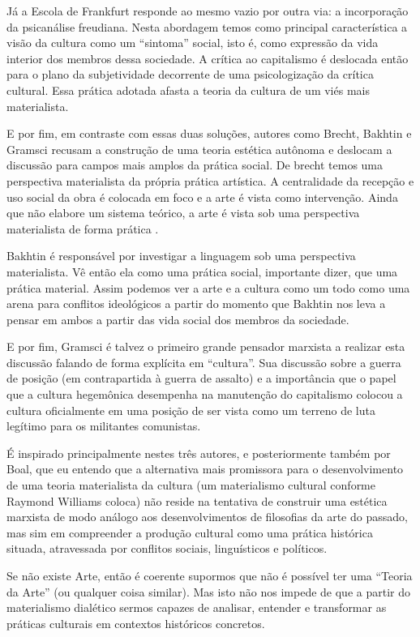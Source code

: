 Já a Escola de Frankfurt responde ao mesmo vazio por outra via: a incorporação da psicanálise freudiana. Nesta abordagem temos como principal característica a visão da cultura como um “sintoma” social, isto é, como expressão da vida interior dos membros dessa sociedade. A crítica ao capitalismo é deslocada então para o plano da subjetividade decorrente de uma psicologização da crítica cultural. Essa prática adotada afasta a teoria da cultura de um viés mais materialista.

E por fim, em contraste com essas duas soluções, autores como Brecht, Bakhtin e Gramsci recusam a construção de uma teoria estética autônoma e deslocam a discussão para campos mais amplos da prática social. De brecht temos uma perspectiva materialista da própria prática artística. A centralidade da recepção e uso social da obra é colocada em foco e a arte é vista como intervenção. Ainda que não elabore um sistema teórico, a arte é vista sob uma perspectiva materialista de forma prática .

Bakhtin é responsável por investigar a linguagem sob uma perspectiva materialista. Vê então ela como uma prática social, importante dizer, que uma prática material. Assim podemos ver a arte e a cultura como um todo como uma arena para conflitos ideológicos a partir do momento que Bakhtin nos leva a pensar em ambos a partir das vida social dos membros da sociedade. 

E por fim, Gramsci é talvez o primeiro grande pensador marxista a realizar esta discussão falando de forma explícita em “cultura”. Sua discussão sobre a guerra de posição (em contrapartida à guerra de assalto) e a importância que o papel que a cultura hegemônica desempenha na manutenção do capitalismo colocou a cultura oficialmente em uma posição de ser vista como um terreno de luta legítimo para os militantes comunistas.

É inspirado principalmente nestes três autores, e posteriormente também por Boal, que eu entendo que a alternativa mais promissora para o desenvolvimento de uma teoria materialista da cultura (um materialismo cultural conforme Raymond Williams coloca) não reside na tentativa de construir uma estética marxista de modo análogo aos desenvolvimentos de filosofias da arte do passado, mas sim em compreender a produção cultural como uma prática histórica situada, atravessada por conflitos sociais, linguísticos e políticos.

Se não existe Arte, então é coerente supormos que não é possível ter uma “Teoria da Arte” (ou qualquer coisa similar). Mas isto não nos impede de que a partir do materialismo dialético sermos  capazes de analisar, entender e transformar as práticas culturais em contextos históricos concretos.

